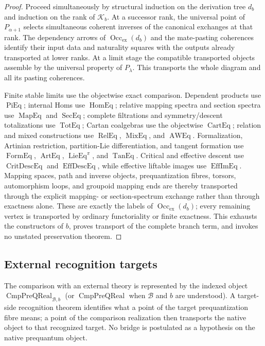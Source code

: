 \begin{proof}
Proceed simultaneously by structural induction on the derivation tree $d_b$
and induction on the rank of $\mathcal K_b$.  At a successor rank, the
universal point of $P_{\alpha+1}$ selects simultaneous coherent inverses of the
canonical exchanges at that rank.  The dependency arrows of
$\operatorname{Occ}_{\mathrm{ex}}(d_b)$ and the mate-pasting coherences identify
their input data and naturality squares with the outputs already transported at
lower ranks.
At a limit stage the compatible transported objects assemble by the universal
property of $P_\lambda$.  This transports the whole diagram and all its pasting
coherences.

Finite stable limits use the objectwise exact comparison.  Dependent products use
$\operatorname{PiEq}$; internal Homs use $\operatorname{HomEq}$; relative
mapping spectra and section spectra use $\operatorname{MapEq}$ and
$\operatorname{SecEq}$; complete filtrations and symmetry/descent totalizations
use $\operatorname{TotEq}$;
Cartan coalgebras use the objectwise $\operatorname{CartEq}$; relation and mixed
constructions use $\operatorname{RelEq}$, $\operatorname{MixEq}$, and
$\operatorname{AWEq}$.  Formalization, Artinian restriction, partition-Lie
differentiation, and tangent formation use
$\operatorname{FormEq}$, $\operatorname{ArtEq}$,
$\operatorname{LieEq}^{\pi}$, and $\operatorname{TanEq}$.  Critical and
effective descent use $\operatorname{CritDescEq}$ and
$\operatorname{EffDescEq}$, while effective liftable images use
$\operatorname{EffImEq}$.  Mapping spaces, path and inverse objects,
prequantization fibres, torsors, automorphism loops, and groupoid mapping ends
are thereby transported through the explicit mapping- or section-spectrum
exchange rather than through exactness alone.  These are exactly the labels of
$\operatorname{Occ}_{\mathrm{ex}}(d_b)$; every remaining vertex is transported
by ordinary functoriality or finite exactness.  This exhausts the constructors of
$b$, proves transport of the complete branch term, and invokes no unstated
preservation theorem.
\end{proof}

\subsection{External recognition targets}
\label{subsec:prequantum-external-recognition-targets}

The comparison with an external theory is represented by the indexed object
$\operatorname{CmpPreQReal}_{\mathcal B,b}$ (or
$\operatorname{CmpPreQReal}$ when $\mathcal B$ and $b$ are understood).  A
target-side recognition theorem identifies
what a point of the target prequantization fibre means; a point of the comparison
realization then transports the native object to that recognized target.  No
bridge is postulated as a hypothesis on the native prequantum object.

